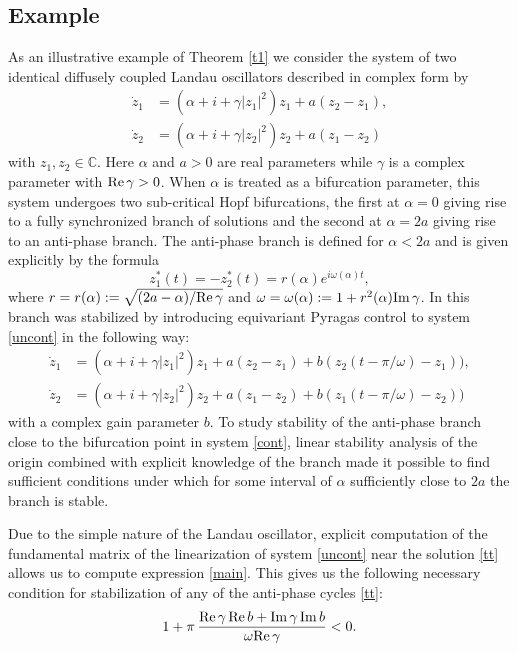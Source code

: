 \documentclass{article}
\begin{document}
\subsection{Example}\label{example}
As an illustrative example  of Theorem \ref{t1} we consider the system of two identical diffusely coupled Landau oscillators described in complex form by 
\begin{equation}
\label{uncont}
\begin{aligned}
\dot z_1 &= (\alpha +i + \gamma|z_1|^2)z_1 + a(z_2 -z_1),\\
\dot z_2 &= (\alpha +i + \gamma|z_2|^2)z_2 + a(z_1 -z_2)
\end{aligned}
\end{equation}
with $z_1,z_2\in \mathbb{C}$. Here $\alpha$ and $a>0$ are real parameters while $\gamma$ is a complex parameter with ${\rm Re}\,\gamma>0$. When $\alpha$ is treated as a bifurcation parameter, this system undergoes two sub-critical Hopf bifurcations, the first at $\alpha = 0$ giving rise to a fully synchronized branch of solutions and the second at $\alpha = 2a$ giving rise to an anti-phase branch. The anti-phase branch is defined for $\alpha<2a$ and is given explicitly by the formula
\begin{equation}\label{tt}
z_1^*(t) = - z_2^*(t)=r(\alpha)e^{i\omega(\alpha) t},
\end{equation}
where $r=r (\alpha):= \sqrt{({2a-\alpha})/{{\rm Re}\, \gamma}}$ and $\omega=\omega (\alpha):= 1+r^2(\alpha) {\rm Im}\,\gamma$.  
In \cite{fiedler_Z_2} this branch was stabilized by introducing equivariant Pyragas control to system \eqref{uncont} in the following way:
\begin{equation}
\label{cont}
\begin{aligned}
\dot z_1 &= (\alpha +i + \gamma|z_1|^2)z_1 + a(z_2 -z_1) + b(z_2(t-{\pi}/{\omega})-z_1)),\\
\dot z_2 &= (\alpha +i + \gamma|z_2|^2)z_2 + a(z_1 -z_2) + b(z_1(t-{\pi}/{\omega})-z_2))
\end{aligned}
\end{equation}
with a complex gain parameter $b$.
To study stability of the anti-phase branch close to the bifurcation point in system \eqref{cont}, linear stability analysis of the origin combined with explicit knowledge of the branch made it possible to find sufficient conditions under which for some interval of $\alpha$ sufficiently close to $2a$ the branch is stable.

Due to the simple nature of the Landau oscillator, explicit computation of the fundamental matrix of the linearization of system \eqref{uncont} near the solution \eqref{tt} allows us to compute expression \eqref{main}. This gives us the following  necessary condition for stabilization of any of the anti-phase cycles \eqref{tt}: 
\begin{equation}
\label{cond}
1+\pi\,\frac{{\rm Re} \, \gamma \, {\rm Re}\, b+ {\rm Im}\, \gamma \, {\rm Im}\, b}{ \omega{\rm Re }\, \gamma}  < 0.
\end{equation}
\end{document}
